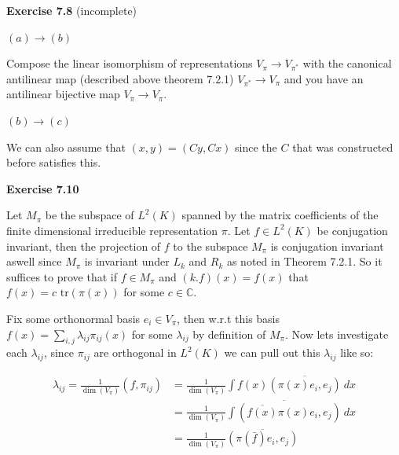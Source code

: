 \documentclass{article}
\begin{document}
\vspace{0.5cm}

\textbf{Exercise 7.8} (incomplete)

\vspace{0.5cm}

$(a) \to (b)$

\vspace{0.3cm}

\noindent Compose the linear isomorphism of representations $V_\pi \rightarrow V_{\pi^*}$ with the canonical antilinear map (described above theorem 7.2.1) $V_{\pi^*} \rightarrow V_\pi$ and you have an antilinear bijective map $V_{\pi} \rightarrow V_{\pi}$.

\vspace{0.3cm}

$(b) \to (c)$

\vspace{0.3cm}

\noindent We can also assume that $(x,y) = (Cy,Cx)$ since the $C$ that was constructed before satisfies this. 

\vspace{0.5cm}

\textbf{Exercise 7.10}

\vspace{0.5cm}

Let $M_\pi$ be the subspace of $L^2(K)$ spanned by the matrix coefficients of the finite dimensional irreducible representation $\pi$. Let $f \in L^2(K)$ be conjugation invariant, then the projection of $f$ to the subspace $M_\pi$ is conjugation invariant aswell since $M_\pi$ is invariant under $L_k$ and $R_k$ as noted in Theorem 7.2.1. So it suffices to prove that if $f \in M_\pi$ and $(k.f)(x) = f(x)$ that $f(x) = c \text{ tr}(\pi(x))$ for some $c \in \mathbb C$.

Fix some orthonormal basis $e_i \in V_\pi$, then w.r.t this basis $f(x) = \sum\limits_{i,j}\lambda_{ij}\pi_{ij}(x)$ for some $\lambda_{ij}$ by definition of $M_\pi$. Now lets investigate each $\lambda_{ij}$, since $\pi_{ij}$ are orthogonal in $L^2(K)$ we can pull out this $\lambda_{ij}$ like so:

\begin{align*}
    \lambda_{ij} =\frac{1}{\dim(V_\pi)}  (f,\pi_{ij}) & =\frac{1}{\dim(V_\pi)} \int f(x) \overline{(\pi(x) e_i, e_j)} \ dx \\
    & =\frac{1}{\dim(V_\pi)} \overline{\int (\overline{f(x)}\pi(x) e_i, e_j)} \ dx \\
    & = \frac{1}{\dim(V_\pi)} \overline{(\pi(\bar f)e_i, e_j)} 
\end{align*}
\end{document}
